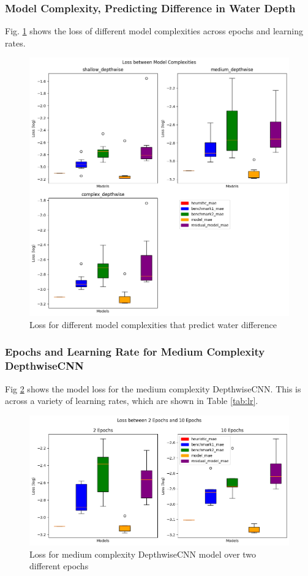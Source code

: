 \subsubsection*{Model Complexity, Predicting Difference in Water Depth}
Fig. \ref{fig:depthwise-complexity} shows the loss of different model complexities across epochs and learning rates. 
\begin{figure}[tbph]
	\centering
	\includegraphics[width=0.7\linewidth, height=0.4\textheight]{Figures/Results/Diff_Complexity_Lr_Epochs/Complexity/Box_model_complexity}
	\caption[Loss Depending on Model Complexity for DepthwiseCNN]{Loss for different model complexities that predict water difference}
	\label{fig:depthwise-complexity}
\end{figure}

\subsubsection*{Epochs and Learning Rate for Medium Complexity DepthwiseCNN}
Fig \ref{fig:epochs} shows the model loss for the medium complexity DepthwiseCNN. This is across a variety of learning rates, which are shown in Table \ref{tab:lr}.

\begin{figure}[tbph]
	\centering
	\includegraphics[width=0.8\linewidth, height=0.3\textheight]{Figures/Results/Diff_Complexity_Lr_Epochs/Epochs_Lr/Box_epochs}
	\caption[Loss between two different Epochs]{Loss for medium complexity DepthwiseCNN model over two different epochs}
	\label{fig:epochs}
\end{figure}


